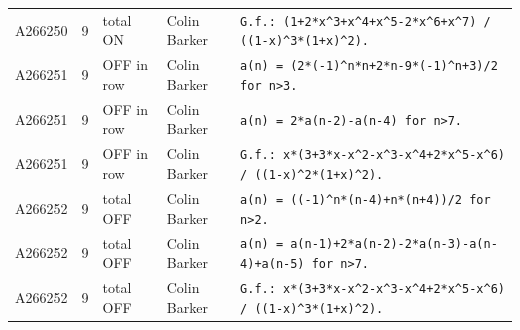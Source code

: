 \documentclass[11pt]{article}
\theoremstyle{definition}
\theoremstyle{remark}
\begin{document}
{\begin{longtable}{p{1.3cm}p{0.7cm}p{2.4cm}p{2.3cm}p{7.3cm}}
A266250 & 9 & total ON & Colin Barker & \texttt{G.f.: \allowbreak{}(1+\allowbreak{}2*\allowbreak{}x\^{}3+\allowbreak{}x\^{}4+\allowbreak{}x\^{}5-\allowbreak{}2*\allowbreak{}x\^{}6+\allowbreak{}x\^{}7)\allowbreak{} \allowbreak{}/\allowbreak{} \allowbreak{}((1-\allowbreak{}x)\allowbreak{}\^{}3*\allowbreak{}(1+\allowbreak{}x)\allowbreak{}\^{}2)\allowbreak{}.} \\
A266251 & 9 & OFF in row & Colin Barker & \texttt{a(n)\allowbreak{} \allowbreak{}=\allowbreak{} \allowbreak{}(2*\allowbreak{}(-\allowbreak{}1)\allowbreak{}\^{}n*\allowbreak{}n+\allowbreak{}2*\allowbreak{}n-\allowbreak{}9*\allowbreak{}(-\allowbreak{}1)\allowbreak{}\^{}n+\allowbreak{}3)\allowbreak{}/\allowbreak{}2 \allowbreak{}for \allowbreak{}n>3.} \\
A266251 & 9 & OFF in row & Colin Barker & \texttt{a(n)\allowbreak{} \allowbreak{}=\allowbreak{} \allowbreak{}2*\allowbreak{}a(n-\allowbreak{}2)\allowbreak{}-\allowbreak{}a(n-\allowbreak{}4)\allowbreak{} \allowbreak{}for \allowbreak{}n>7.} \\
A266251 & 9 & OFF in row & Colin Barker & \texttt{G.f.: \allowbreak{}x*\allowbreak{}(3+\allowbreak{}3*\allowbreak{}x-\allowbreak{}x\^{}2-\allowbreak{}x\^{}3-\allowbreak{}x\^{}4+\allowbreak{}2*\allowbreak{}x\^{}5-\allowbreak{}x\^{}6)\allowbreak{} \allowbreak{}/\allowbreak{} \allowbreak{}((1-\allowbreak{}x)\allowbreak{}\^{}2*\allowbreak{}(1+\allowbreak{}x)\allowbreak{}\^{}2)\allowbreak{}.} \\
A266252 & 9 & total OFF & Colin Barker & \texttt{a(n)\allowbreak{} \allowbreak{}=\allowbreak{} \allowbreak{}((-\allowbreak{}1)\allowbreak{}\^{}n*\allowbreak{}(n-\allowbreak{}4)\allowbreak{}+\allowbreak{}n*\allowbreak{}(n+\allowbreak{}4)\allowbreak{})\allowbreak{}/\allowbreak{}2 \allowbreak{}for \allowbreak{}n>2.} \\
A266252 & 9 & total OFF & Colin Barker & \texttt{a(n)\allowbreak{} \allowbreak{}=\allowbreak{} \allowbreak{}a(n-\allowbreak{}1)\allowbreak{}+\allowbreak{}2*\allowbreak{}a(n-\allowbreak{}2)\allowbreak{}-\allowbreak{}2*\allowbreak{}a(n-\allowbreak{}3)\allowbreak{}-\allowbreak{}a(n-\allowbreak{}4)\allowbreak{}+\allowbreak{}a(n-\allowbreak{}5)\allowbreak{} \allowbreak{}for \allowbreak{}n>7.} \\
A266252 & 9 & total OFF & Colin Barker & \texttt{G.f.: \allowbreak{}x*\allowbreak{}(3+\allowbreak{}3*\allowbreak{}x-\allowbreak{}x\^{}2-\allowbreak{}x\^{}3-\allowbreak{}x\^{}4+\allowbreak{}2*\allowbreak{}x\^{}5-\allowbreak{}x\^{}6)\allowbreak{} \allowbreak{}/\allowbreak{} \allowbreak{}((1-\allowbreak{}x)\allowbreak{}\^{}3*\allowbreak{}(1+\allowbreak{}x)\allowbreak{}\^{}2)\allowbreak{}.} \\

\end{longtable}}
\end{document}
